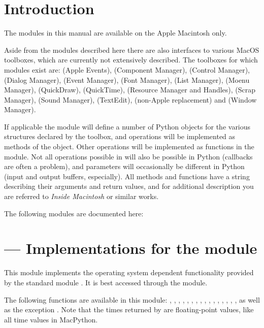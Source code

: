 \section{Introduction}
\label{intro}

The modules in this manual are available on the Apple Macintosh only.

Aside from the modules described here there are also interfaces to
various MacOS toolboxes, which are currently not extensively
described. The toolboxes for which modules exist are:
 (Apple Events),
 (Component Manager),
 (Control Manager),
 (Dialog Manager),
 (Event Manager),
 (Font Manager),
 (List Manager),
 (Moenu Manager),
 (QuickDraw),
 (QuickTime),
 (Resource Manager and Handles),
 (Scrap Manager),
 (Sound Manager),
 (TextEdit),
 (non-Apple  replacement) and
 (Window Manager).

If applicable the module will define a number of Python objects for
the various structures declared by the toolbox, and operations will be
implemented as methods of the object. Other operations will be
implemented as functions in the module. Not all operations possible in
\C{} will also be possible in Python (callbacks are often a problem), and
parameters will occasionally be different in Python (input and output
buffers, especially). All methods and functions have a 
string describing their arguments and return values, and for
additional description you are referred to \emph{Inside Macintosh} or
similar works.

The following modules are documented here:

\localmoduletable


\section{ ---
         Implementations for the  module}



This module implements the operating system dependent functionality
provided by the standard module .  It is
best accessed through the  module.

The following functions are available in this module:
,
,
,
,
,
,
,
,
,
,
,
,
,
,
,
,
as well as the exception . Note that the times
returned by  are floating-point values, like all time
values in MacPython.

